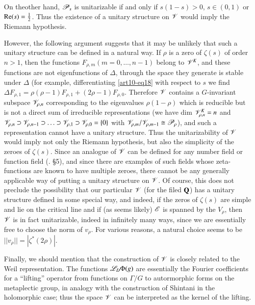 On the\pageoriginale other hand, $\mathscr{P}_s$ is unitarizable if and only if $s (1-s) >0$, \ie $s \in (0,1)$ or $\operatorname{Re} (s) =\frac{1}{2}$. Thus the existence of a unitary structure on $\mathscr{V}$ would imply the Riemann hypothesis.

However, the following argument suggests that it may be unlikely that such a unitary structure can be defined in a natural way. If $\rho$ is a zero of $\zeta(s)$ of order $n>1$, then the functions $F_{\rho, m} (m = 0, \ldots, n -1)$ belong to $\mathscr{V}^K$, and these functions are not eigenfunctions of $\Delta$, through the space they generate is stable under $\Delta$ (for example, differentiating \eqref{art10-eq18} with  respect to $s$ we find $\Delta F_{\rho, 1} = \rho (\rho -1) F_{\rho, 1} + (2 \rho -1) F_{\rho, 0}$. Therefore $\mathscr{V}$ contains a $G$-invariant subspace $\mathscr{V}_{\rho, n}$ corresponding to the eigenvalues $\rho (1-\rho)$ which is reducible but is not a direct sum of irreducible representations (we have dim $\mathscr{V}^K_{\rho, n} = n$ and $\mathscr{V}_{\rho,n} \supset \mathscr{V}_{\rho, n -1} \supset \ldots \supset \mathscr{V}_{\rho, 1} \supset \mathscr{V}_{\rho,0}  =\{0\}$ with $\mathscr{V}_{\rho,m} / \mathscr{V}_{\rho, m -1} \cong \mathscr{P}_\rho$), and such a representation cannot have a unitary structure. Thus the unitarizability of $\mathscr{V}$ would imply not only the Riemann hypothesis, but also the simplicity of the zeroes of $\zeta(s)$. Since an analogue of $\mathscr{V}$ can be defined for any number field or function field (\cf. \S 5), and since there are examples of such fields whose zeta-functions are known to have multiple zeroes, there cannot be any generally applicable way of putting a unitary structure on $\mathscr{V}$. Of course, this does not preclude the possibility that our particular $\mathscr{V}$ (for the filed $\mathbf{Q}$) has a unitary structure defined in some special way, and indeed, if the zeros of $\zeta (s)$ are simple and lie on the critical line and if (as seems likely) $\mathscr{E}$ is spanned by the $V_\rho$, then $\mathscr{V}$ is in fact unitarizable, indeed in infinitely many ways, since we are essentially free to choose the norm of $v_\rho$. For various reasons, a natural choice seems to be $||v_\rho|| = |\zeta^\ast(2\rho)|$.

Finally, we should mention that the construction of $\mathscr{V}$ is closely related to the Weil representation. The functions $\mathscr{L}_D \Phi (g)$ are essentially the Fourier coefficients for a ``lifting'' operator from functions on $\Gamma / G$ to autormorphic forms on the metaplectic group, in analogy with the construction of Shintani \cite{art10-9} in the holomorphic case; thus the space $\mathscr{V}$ can be interpreted as the kernel of the lifting.

